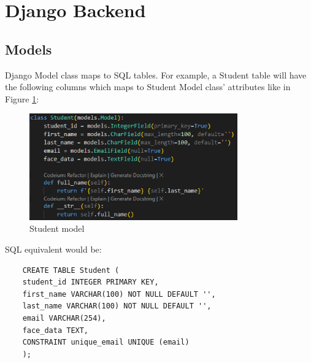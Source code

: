 \section{Django Backend}
\subsection{Models}
Django Model class maps to SQL tables. For example, a Student table will have the following columns which maps to Student Model class' attributes like in Figure \ref{fig:models}: 

\begin{figure}[h] %
	\centering
	\includegraphics[width=0.8\textwidth]{figures/chapter4/models.png} %
	\caption{Student model}
	\label{fig:models}
\end{figure}

SQL equivalent would be:
\begin{verbatim}
	CREATE TABLE Student (
	student_id INTEGER PRIMARY KEY,
	first_name VARCHAR(100) NOT NULL DEFAULT '',
	last_name VARCHAR(100) NOT NULL DEFAULT '',
	email VARCHAR(254),
	face_data TEXT,
	CONSTRAINT unique_email UNIQUE (email)
	);
\end{verbatim}

